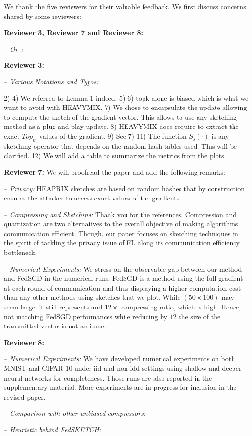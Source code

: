 \documentclass{article}
\begin{document}
We thank the five reviewers for their valuable feedback. We first discuss concerns shared by some reviewers:
\vspace{-2pt}

\textbf{Reviewer 3, Reviewer 7 and Reviewer 8:} \vspace{-5pt}

-- \textit{On :} 


\textbf{Reviewer 3:} \vspace{-5pt}

-- \textit{Various Notations and Typos:} 

2) 
4) We referred to Lemma 1 indeed.
5) 
6) topk alone is biased which is what we want to avoid with HEAVYMIX.
7) We chose to encapsulate the update allowing to compute the sketch of the gradient vector. This allows to use any sketching method as a plug-and-play update.
8) HEAVYMIX does require to extract the exact $Top_m$ values of the gradient.
9) See 7)
11) The function $S_j(\cdot)$ is any sketching operator that depends on the random hash tables used. This will be clarified.
12) We will add a table to summarize the metrics from the plots.




\textbf{Reviewer 7:} We will proofread the paper and add the following remarks:\vspace{-5pt}

-- \textit{Privacy:} HEAPRIX sketches are based on random hashes that by construction ensures the attacker to access exact values of the gradients.

-- \textit{Compressing and Sketching:} Thank you for the references.
Compression and quantization are two alternatives to the overall objective of making algorithms communication efficient.
Though, our paper focuses on sketching techniques in the spirit of tackling the privacy issue of FL along its communication efficiency bottleneck.


-- \textit{Numerical Experiments:} 
We stress on the observable gap between our method and FedSGD in the numerical runs. FedSGD is a method using the full gradient at each round of communication and thus displaying a higher computation cost than any other methods using sketches that we plot.
While $(50 \times 100)$ may seem large, it still represents and $12 \times$ compressing ratio, which is high. 
Hence, not matching FedSGD performances while reducing by $12$ the size of the transmitted vector is not an issue.

\textbf{Reviewer 8:} \vspace{-5pt}

-- \textit{Numerical Experiments:} We have developed numerical experiments on both MNIST and CIFAR-10 under iid and non-idd settings using shallow and deeper neural networks for completeness. Those runs are also reported in the supplementary material.
More experiments are in progress for inclusion in the revised paper.

-- \textit{Comparison with other unbiased compressors:} 

-- \textit{Heuristic behind FedSKETCH:} 
\end{document}
